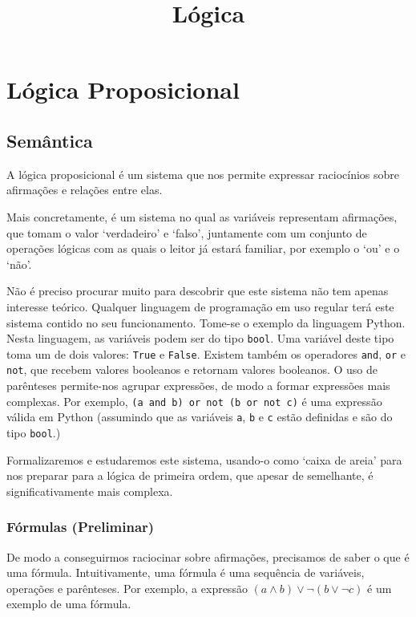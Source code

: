 \documentclass{report}
\title{Lógica}
\author{}
\date{}
\theoremstyle{definition}
\theoremstyle{remark}
\begin{document}
	\maketitle
	\newpage
	
	\tableofcontents
	\newpage
	
	\chapter{Lógica Proposicional}
	
	\section{Semântica}
	
	A lógica proposicional é um sistema que nos permite expressar raciocínios sobre afirmações e relações entre elas.
	
	Mais concretamente, é um sistema no qual as variáveis representam afirmações, que tomam o valor `verdadeiro' e `falso', juntamente com um conjunto de operações lógicas com as quais o leitor já estará familiar, por exemplo o `ou' e o `não'.
	
	Não é preciso procurar muito para descobrir que este sistema não tem apenas interesse teórico. Qualquer linguagem de programação em uso regular terá este sistema contido no seu funcionamento. Tome-se o exemplo da linguagem Python. Nesta linguagem, as variáveis podem ser do tipo \texttt{bool}. Uma variável deste tipo toma um de dois valores: \texttt{True} e \texttt{False}. Existem também os operadores \texttt{and}, \texttt{or} e \texttt{not}, que recebem valores booleanos e retornam valores booleanos. O uso de parênteses permite-nos agrupar expressões, de modo a formar expressões mais complexas. Por exemplo, \texttt{(a and b) or not (b or not c)} é uma expressão válida em Python (assumindo que as variáveis \texttt{a}, \texttt{b} e \texttt{c} estão definidas e são do tipo \texttt{bool}.)
	
	Formalizaremos e estudaremos este sistema, usando-o como `caixa de areia' para nos preparar para a lógica de primeira ordem, que apesar de semelhante, é significativamente mais complexa.
	
	\subsection{Fórmulas (Preliminar)}
	
	De modo a conseguirmos raciocinar sobre afirmações, precisamos de saber o que é uma fórmula. Intuitivamente, uma fórmula é uma sequência de variáveis, operações e parênteses. Por exemplo, a expressão $(a \land b) \lor \neg (b \lor \neg c)$ é um exemplo de uma fórmula.
	
\end{document}

